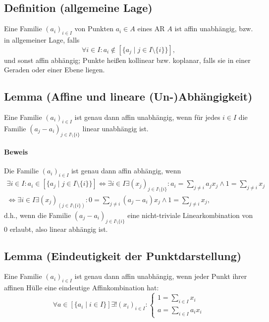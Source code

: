 \subsection{Definition (allgemeine Lage)}
	\begin{Definition}
		Eine Familie $ (a_i)_{i\in I} $ von Punkten $ a_i\in A $ eines AR $ A $ ist affin unabhängig, bzw. in allgemeiner Lage, falls
		\[ \forall i\in I:a_i\notin [\{a_j\mid j\in I\setminus \{i\}\}], \]
		und sonst affin abhängig; Punkte heißen kollinear bzw. koplanar, falls sie in einer Geraden oder einer Ebene liegen.
	\end{Definition}
	
\subsection{Lemma (Affine und lineare (Un-)Abhängigkeit)}
	\begin{Lemma}
		Eine Familie $ (a_i)_{i\in I} $ ist genau dann affin unabhängig, wenn für jedes $ i\in I $ die Familie $ (a_j-a_i)_{j\in I\setminus \{i\}} $ linear unabhängig ist.
	\end{Lemma}
	
\paragraph{Beweis}
	Die Familie $ (a_i)_{i\in I} $ ist genau dann affin abhängig, wenn
	\begin{gather*}
		\exists i\in I:a_i\in [\{a_j\mid j\in I\setminus \{i\}\}] \Leftrightarrow \exists i\in I\exists(x_j)_{j\in I\setminus \{i\}}:a_i=\sum_{j\neq i}a_jx_j\land 1=\sum_{j\neq i}x_j\\
		\Leftrightarrow \exists i\in I\exists (x_j)_(j\in I\setminus \{i\}):0=\sum_{j\neq i}(a_j-a_i)x_j \land 1=\sum_{j\neq i}x_j,
	\end{gather*}
	d.h., wenn die Familie $ (a_j-a_i)_{j\in I\setminus \{i\}} $ eine nicht-triviale Linearkombination von 0 erlaubt, also linear abhängig ist.
	
\subsection{Lemma (Eindeutigkeit der Punktdarstellung)}
	\begin{Lemma}
		Eine Familie $ (a_i)_{i\in I} $ ist genau dann affin unabhängig, wenn jeder Punkt ihrer affinen Hülle eine eindeutige Affinkombination hat:
		\[ \forall a\in [\{a_i\mid i\in I\}]\exists!(x_i)_{i\in I}:
			\begin{cases}
			1 = \sum_{i\in I}x_i\\
			a = \sum_{i\in I}a_ix_i
			\end{cases}\]
	\end{Lemma}
	
